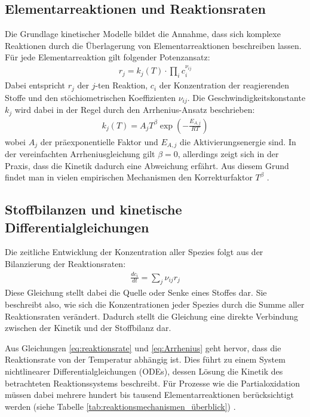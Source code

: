             \subsection{Elementarreaktionen und Reaktionsraten}
                Die Grundlage kinetischer Modelle bildet die Annahme, dass sich komplexe Reaktionen durch die Überlagerung von Elementarreaktionen beschreiben lassen. Für jede Elementarreaktion gilt folgender Potenzansatz:
                \begin{align}
                    r_j = k_j(T)\cdot \prod_i c_i^{\nu_{ij}} \label{eq:reaktionsrate}
                \end{align}
                Dabei entspricht $r_j$ der $j$-ten Reaktion, $c_i$ der Konzentration der reagierenden Stoffe und den stöchiometrischen Koeffizienten $\nu_{ij}$. Die Geschwindigkeitskonstante $k_j$ wird dabei in der Regel durch den Arrhenius-Ansatz beschrieben:
                \begin{align}
                    k_j(T) = A_jT^{\beta}\exp\left( -\frac{E_{A,j}}{RT} \right) \label{eq:Arrhenius}
                \end{align}
                wobei $A_j$ der präexponentielle Faktor und $E_{A,j}$ die Aktivierungsenergie sind. In der vereinfachten Arrheniusgleichung gilt $\beta = 0$, allerdings zeigt sich in der Praxis, dass die Kinetik dadurch eine Abweichung erfährt. Aus diesem Grund findet man in vielen empirischen Mechanismen den Korrekturfaktor $T^\beta$ \cite{GuttelTurek2021}. 
        \subsection{Stoffbilanzen und kinetische Differentialgleichungen}
            Die zeitliche Entwicklung der Konzentration aller Spezies folgt aus der Bilanzierung der Reaktionsraten:
            \begin{align}
                \label{eq:stoffbilanz}
                \frac{dc_i}{dt}=\sum_j  \nu_{ij}r_j
            \end{align}
            Diese Gleichung stellt dabei die Quelle oder Senke eines Stoffes dar. Sie beschreibt also, wie sich die Konzentrationen jeder Spezies durch die Summe aller Reaktionsraten verändert. Dadurch stellt die Gleichung eine direkte Verbindung zwischen der Kinetik und der Stoffbilanz dar. 

            Aus Gleichungen \ref{eq:reaktionsrate} und \ref{eq:Arrhenius} geht hervor, dass die Reaktionsrate von der Temperatur abhängig ist. Dies führt zu einem System nichtlinearer Differentialgleichungen (ODEs), dessen Lösung die Kinetik des betrachteten Reaktionssystems beschreibt. Für Prozesse wie die Partialoxidation müssen dabei mehrere hundert bis tausend Elementarreaktionen berücksichtigt werden (siehe Tabelle  \ref{tab:reaktionsmechanismen_überblick}) \cite{GuttelTurek2021}.
